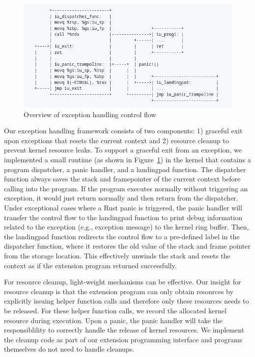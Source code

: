 \begin{figure}
	\includegraphics[width=0.8\linewidth]{figs/EH.png}
	\centering
	\vspace{-10pt}
	\caption{Overview of exception handling control flow}
	\label{fig:eh-overview}
	\vspace{-10pt}
\end{figure}

Our exception handling framework consists of two components: 1) graceful exit
    upon exceptions that resets the current context and 2) resource cleanup to
    prevent kernel resource leaks.
To support a graceful exit from an exception, we implemented a small runtime
    (as shown in Figure~\ref{fig:eh-overview}) in the kernel that contains a
    program dispatcher, a panic handler, and a landingpad function.
The dispatcher function always saves the stack and framepointer of the current
    context before calling into the program.
If the program executes normally without triggering an exception, it would just
    return normally and then return from the dispatcher.
Under exceptional cases where a Rust panic is triggered, the panic handler will
    transfer the control flow to the landingpad function to print debug
    information related to the exception (e.g., exception message) to the
    kernel ring buffer.
Then, the landingpad function redirects the control flow to a pre-defined label
    in the dispatcher function, where it restores the old value of the stack
    and frame pointer from the storage location.
This effectively unwinds the stack and resets the context as if the extension
    program returned successfully.

For resource cleanup, light-weight mechanisms can be effective.
Our insight for resource cleanup is that the extension program can only obtain
    resources by explicitly issuing helper function calls and therefore only
    these resources needs to be released.
For these helper function calls, we record the allocated kernel resource during
    execution.
Upon a panic, the panic handler will take the responsiblility to correctly
    handle the release of kernel resources.
We implement the cleanup code as part of our extension programming interface
    and programs themselves do not need to handle cleanups.
